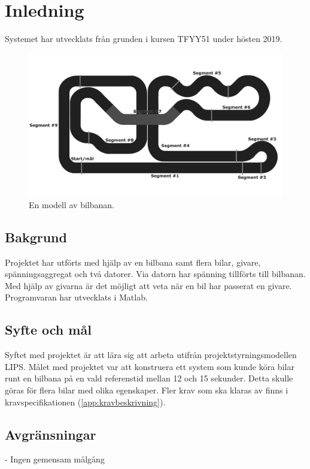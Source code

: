 \section{Inledning}
Systemet har utvecklats från grunden i kursen TFYY51 under hösten 2019.  
\begin{figure}
	\centering
	\includegraphics[width=\linewidth] {Figures/BanaModell}
	\caption{En modell av bilbanan.}
	\label{fig:bilbanan}
\end{figure}

\subsection{Bakgrund} 

Projektet har utförts med hjälp av en bilbana samt flera bilar, givare,
spänningsaggregat och två datorer. Via datorn har spänning
tillförts till bilbanan. Med hjälp av givarna är det möjligt att veta när en bil
har passerat en givare. Programvaran har utvecklats i Matlab.

\subsection{Syfte och mål}

Syftet med projektet är att lära sig att arbeta utifrån
projektstyrningsmodellen LIPS. Målet med projektet var att konstruera ett system
som kunde köra bilar runt en bilbana på en vald referenstid mellan 12 och 15
sekunder. Detta skulle göras för flera bilar med olika egenskaper. Fler krav som
ska klaras av finns i kravspecifikationen (\ref{app:kravbeskrivning}).

\subsection{Avgränsningar}

- Ingen gemensam målgång
